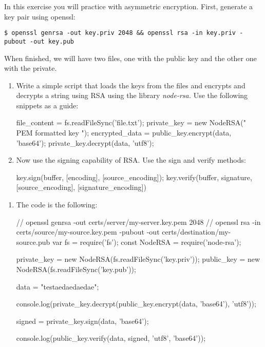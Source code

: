 
\begin{Exercise}[label={basic-js-crypto-rsa}]
In this exercise you will practice with asymmetric encryption.
First, generate a key pair using openssl:

\begin{lstlisting}[style=terms]
$ openssl genrsa -out key.priv 2048 && openssl rsa -in key.priv -pubout -out key.pub
\end{lstlisting}

When finished, we will have two files, 
one with the public key and the other one with the private.

\begin{enumerate}[1.]
	
\item Write a simple script that loads the keys from the files 
and encrypts and decrypts a string using RSA using 
the library \textit{node-rsa.}
Use the following snippets as a guide:
\begin{js}
file_content = fs.readFileSync('file.txt');
private_key = new NodeRSA(" PEM formatted key ");
encrypted_data = public_key.encrypt(data, 'base64');
private_key.decrypt(data, 'utf8');
\end{js}
\item Now use the signing capability of RSA. Use the sign and verify methods:
\begin{js}
key.sign(buffer, [encoding], [source_encoding]);
key.verify(buffer, signature, [source_encoding], [signature_encoding])
\end{js}
	
\end{enumerate}
\end{Exercise}

\begin{Answer}[ref={basic-js-crypto-rsa}]
\begin{enumerate}[1.]
\item The code is the following: 

\begin{js}
// openssl genrsa -out certs/server/my-server.key.pem 2048
// openssl rsa -in certs/source/my-source.key.pem -pubout -out certs/destination/my-source.pub
var fs = require('fs');
const NodeRSA = require('node-rsa');

private_key = new NodeRSA(fs.readFileSync('key.priv'));
public_key = new NodeRSA(fs.readFileSync('key.pub'));


data = "testaedaedaedae";

console.log(private_key.decrypt(public_key.encrypt(data, 'base64'), 'utf8'));

signed = private_key.sign(data, 'base64');

console.log(public_key.verify(data, signed, 'utf8', 'base64'));
\end{js}
\end{enumerate}
\end{Answer}
